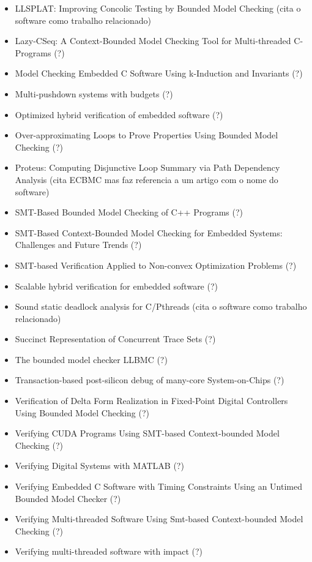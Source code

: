 \begin{itemize}
\item LLSPLAT: Improving Concolic Testing by Bounded Model Checking (cita o software como trabalho relacionado)
\item Lazy-CSeq: A Context-Bounded Model Checking Tool for Multi-threaded C-Programs (?)
\item Model Checking Embedded C Software Using k-Induction and Invariants (?)
\item Multi-pushdown systems with budgets (?)
\item Optimized hybrid verification of embedded software (?)
\item Over-approximating Loops to Prove Properties Using Bounded Model Checking (?)
\item Proteus: Computing Disjunctive Loop Summary via Path Dependency Analysis (cita ECBMC mas faz referencia a um artigo com o nome do software)
\item SMT-Based Bounded Model Checking of C++ Programs (?)
\item SMT-Based Context-Bounded Model Checking for Embedded Systems: Challenges and Future Trends (?)
\item SMT-based Verification Applied to Non-convex Optimization Problems (?)
\item Scalable hybrid verification for embedded software (?)
\item Sound static deadlock analysis for C/Pthreads (cita o software como trabalho relacionado)
\item Succinct Representation of Concurrent Trace Sets (?)
\item The bounded model checker LLBMC (?)
\item Transaction-based post-silicon debug of many-core System-on-Chips (?)
\item Verification of Delta Form Realization in Fixed-Point Digital Controllers Using Bounded Model Checking (?)
\item Verifying CUDA Programs Using SMT-based Context-bounded Model Checking (?)
\item Verifying Digital Systems with MATLAB (?)
\item Verifying Embedded C Software with Timing Constraints Using an Untimed Bounded Model Checker (?)
\item Verifying Multi-threaded Software Using Smt-based Context-bounded Model Checking (?)
\item Verifying multi-threaded software with impact (?)
\end{itemize}

